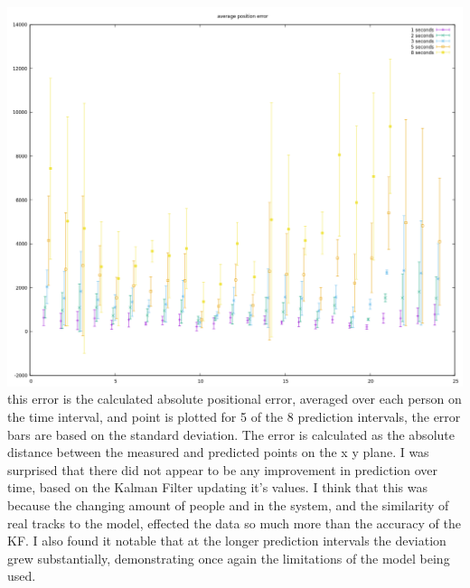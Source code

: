\documentclass[10pt,a4paper]{article}
\begin{document}
\includegraphics[width=\textwidth]{../graphs/average_position_error.png}\\
this error is the calculated absolute positional error, averaged over each person on the time interval, and point is plotted for 5 of the 8 prediction intervals, the error bars are based on the standard deviation. The error is calculated as the absolute distance between the measured and predicted points on the x y plane. I was surprised that there did not appear to be any improvement in prediction over time, based on the Kalman Filter updating it's values. I think that this was because the changing amount of people and in the system, and the similarity of real tracks to the model, effected the data so much more than the accuracy of the KF. I also found it notable that at the longer prediction intervals the deviation grew substantially, demonstrating once again the limitations of the model being used.
 
\end{document}
